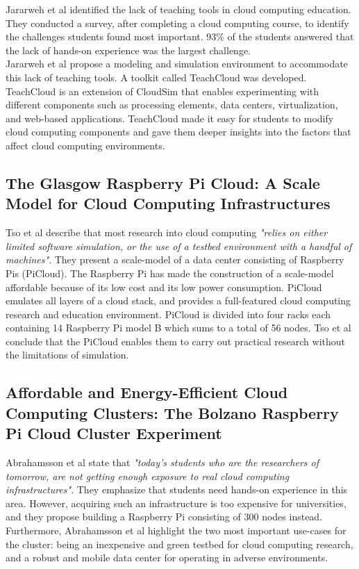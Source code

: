 Jararweh et al identified the lack of teaching tools in cloud computing education. They conducted a survey, after completing a cloud computing course, to identify the challenges students found most important. 93\% of the students answered that the lack of hands-on experience was the largest challenge.\\

\noindent
Jararweh et al propose a modeling and simulation environment to accommodate this lack of teaching tools. A toolkit called TeachCloud was developed. TeachCloud is an extension of CloudSim that enables experimenting with different components such as processing elements, data centers, virtualization, and web-based applications.
TeachCloud made it easy for students to modify cloud computing components and gave them deeper insights into the factors that affect cloud computing environments.


\subsection*{The Glasgow Raspberry Pi Cloud: A Scale Model for Cloud Computing Infrastructures \cite{tso2013glasgow}}
Tso et al describe that most research into cloud computing \textit{"relies on either limited software simulation, or the use of a testbed environment with a handful of machines"}.
They present a scale-model of a data center consisting of Raspberry Pis (PiCloud). The Raspberry Pi has made the construction of a scale-model affordable because of its low cost and its low power consumption.
PiCloud emulates all layers of a cloud stack, and provides a full-featured cloud computing research and education environment.
PiCloud is divided into four racks each containing 14 Raspberry Pi model B which sums to a total of 56 nodes.
Tso et al conclude that the PiCloud enables them to carry out practical research without the limitations of simulation.


\subsection*{Affordable and Energy-Efficient Cloud Computing Clusters: The Bolzano Raspberry Pi Cloud Cluster Experiment \cite{abrahamsson2013bolzano}}
Abrahamsson et al state that \textit{"today's students who are the researchers of tomorrow, are not getting enough exposure to real cloud computing infrastructures"}. They emphasize that students need hands-on experience in this area. However, acquiring such an infrastructure is too expensive for universities, and they propose building a Raspberry Pi consisting of 300 nodes instead. \\
Furthermore, Abrahamsson et al highlight the two most important use-cases for the cluster: being an inexpensive and green testbed for cloud computing research, and a robust and mobile data center for operating in adverse environments.


